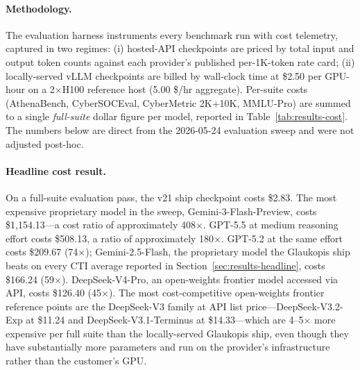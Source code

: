 \documentclass[webpdf,contemporary,large]{oup-authoring-template}
\theoremstyle{thmstyleone}
\theoremstyle{thmstyletwo}
\theoremstyle{thmstylethree}
\begin{document}
\paragraph{Methodology.}
The evaluation harness instruments every benchmark run with cost telemetry, captured in two regimes: (i) hosted-API checkpoints are priced by total input and output token counts against each provider's published per-1K-token rate card; (ii) locally-served vLLM checkpoints are billed by wall-clock time at \$2.50 per GPU-hour on a 2$\times$H100 reference host (5.00 \$/hr aggregate). Per-suite costs (AthenaBench, CyberSOCEval, CyberMetric 2K+10K, MMLU-Pro) are summed to a single \emph{full-suite} dollar figure per model, reported in Table~\ref{tab:results-cost}. The numbers below are direct from the 2026-05-24 evaluation sweep and were not adjusted post-hoc.

\paragraph{Headline cost result.}
On a full-suite evaluation pass, the v21 ship checkpoint costs \$2.83. The most expensive proprietary model in the sweep, Gemini-3-Flash-Preview, costs \$1{,}154.13---a cost ratio of approximately 408$\times$. GPT-5.5 at medium reasoning effort costs \$508.13, a ratio of approximately 180$\times$. GPT-5.2 at the same effort costs \$209.67 (74$\times$); Gemini-2.5-Flash, the proprietary model the Glaukopis ship beats on every CTI average reported in Section~\ref{sec:results-headline}, costs \$166.24 (59$\times$). DeepSeek-V4-Pro, an open-weights frontier model accessed via API, costs \$126.40 (45$\times$). The most cost-competitive open-weights frontier reference points are the DeepSeek-V3 family at API list price---DeepSeek-V3.2-Exp at \$11.24 and DeepSeek-V3.1-Terminus at \$14.33---which are 4--5$\times$ more expensive per full suite than the locally-served Glaukopis ship, even though they have substantially more parameters and run on the provider's infrastructure rather than the customer's GPU.
\end{document}
